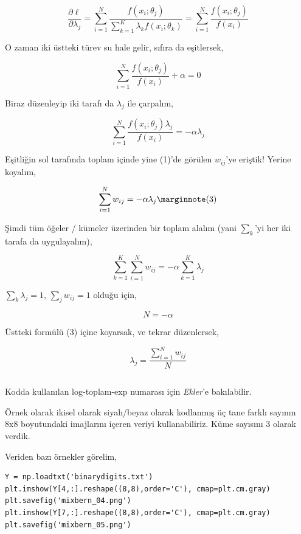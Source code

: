 \documentclass[12pt,fleqn]{article}\usepackage{../../common}
\begin{document}
$$ 
\frac{\partial \ell}{\partial \lambda_j}  = 
\sum _{i=1}^{N}
\frac{f(x_i;\theta_j)}{\sum _{k=1}^{K} \lambda_k f(x_i;\theta_k) }
=
\sum _{i=1}^{N}
\frac{f(x_i;\theta_j)}{f(x_i) }
$$

O zaman iki üstteki türev su hale gelir, sıfıra da eşitlersek,

$$  
\sum _{i=1}^{N} \frac{f(x_i;\theta_j)}{f(x_i) } + \alpha = 0
$$

Biraz düzenleyip iki tarafı da $\lambda_j$ ile çarpalım,

$$
\sum _{i=1}^{N} \frac{f(x_i;\theta_j) \lambda_j}{f(x_i) } = - \alpha \lambda_j 
$$

Eşitliğin sol tarafında toplam içinde yine (1)'de görülen $w_{ij}$'ye eriştik!
Yerine koyalım,

$$
\sum _{i=1}^{N} w_{ij} = - \alpha \lambda_j 
\mlabel{3} 
$$

Şimdi tüm öğeler / kümeler üzerinden bir toplam alalım (yani $\sum_k$'yi her iki
tarafa da uygulayalım),

$$
\sum _{k=1}^{K} \sum _{i=1}^{N} w_{ij} = - \alpha  \sum _{k=1}^{K} \lambda_j
$$


$ \sum_k \lambda_j = 1 $, $\sum_j w_{ij} = 1 $ olduğu için,

$$ 
N = - \alpha 
$$

Üstteki formülü (3) içine koyarsak, ve tekrar düzenlersek,

$$ 
\lambda_j = \frac{\sum _{i=1}^{N} w_{ij}}{N} 
$$

\inputminted[fontsize=\footnotesize]{python}{mixbern.py}

Kodda kullanılan log-toplam-exp numarası için {\em Ekler}'e bakılabilir.

Örnek olarak ikisel olarak siyah/beyaz olarak kodlanmış üç tane farklı sayının
8x8 boyutundaki imajlarını içeren veriyi kullanabiliriz. Küme sayısını 3 olarak
verdik.

Veriden bazı örnekler görelim,

\begin{verbatim}
Y = np.loadtxt('binarydigits.txt')
plt.imshow(Y[4,:].reshape((8,8),order='C'), cmap=plt.cm.gray)
plt.savefig('mixbern_04.png')
plt.imshow(Y[7,:].reshape((8,8),order='C'), cmap=plt.cm.gray)
plt.savefig('mixbern_05.png')
\end{verbatim}
\end{document}
